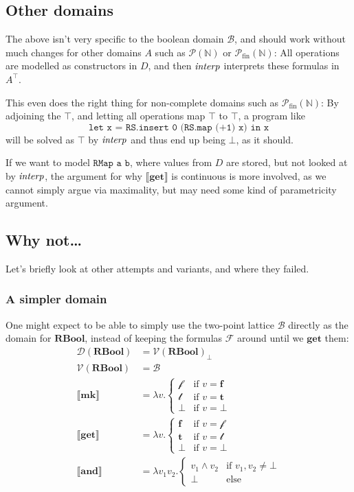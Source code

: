 \documentclass[manuscript,screen,acmsmall,nonacm]{acmart}
\newcommand{\syntax}[1]{\mathbf{#1}}
\newcommand{\tRBool}{\syntax{RBool}}
\newcommand{\sMk}{\syntax{mk}}
\newcommand{\sGet}{\syntax{get}}
\newcommand{\sAnd}{\syntax{and}}
\newcommand{\dFalse}{\mathbf{f}}
\newcommand{\dTrue}{\mathbf{t}}
\newcommand{\rBool}{\mathscr B}
\newcommand{\rTrue}{\mathscr{t}}
\newcommand{\rFalse}{\mathscr{f}}
\newcommand{\dRBool}{\mathcal F}
\newcommand{\D}[1]{\llbracket #1 \rrbracket}
\newcommand{\tV}[1]{\mathcal V(#1)}
\newcommand{\tD}[1]{\mathcal D(#1)}
\begin{document}
\subsection{Other domains}

The above isn’t very specific to the boolean domain $\rBool$, and should work without much changes for other domains $A$ such as $\mathcal P(\mathbb N)$ or $\mathcal P_{\text{fin}}(\mathbb N)$: All operations are modelled as constructors in $D$, and then $\operatorname{\textit{interp}}$ interprets these formulas in $A^\top$.

This even does the right thing for non-complete domains such as $\mathcal P_{\text{fin}}(\mathbb N)$: By adjoining the $\top$, and letting all operations map $\top$ to $\top$, a program like
\[
\texttt{let x = RS.insert 0 (RS.map (+1) x) in x}
\]
will be solved as $\top$ by $\operatorname{\textit{interp}}$ and thus end up being $\bot$, as it should.

If we want to model $\texttt{RMap a b}$, where values from $D$ are stored, but not looked at by $\operatorname{\textit{interp}}$, the argument for why $\D{\sGet}$ is continuous is more involved, as we cannot simply argue via maximality, but may need some kind of parametricity argument.

\subsection{Why not\ldots}\label{sec:why-not}

Let's briefly look at other attempts and variants, and where they failed.

\subsubsection{A simpler domain}

One might expect to be able to simply use the two-point lattice $\rBool$ directly as the domain for $\tRBool$, instead of keeping the formulas $\dRBool$ around until we $\sGet$ them:
\begin{align*}
\tD\tRBool &= {\tV\tRBool}_\bot\\
\tV\tRBool &= \rBool\\
\D{\sMk} &= \lambda v. \begin{cases}
\rFalse & \text{if } v = \dFalse \\
\rTrue & \text{if } v = \dTrue \\
\bot  & \text{if } v = \bot
\end{cases}\\
\D{\sGet} &= \lambda v. \begin{cases}
\dFalse & \text{if } v = \rFalse \\
\dTrue & \text{if } v = \rTrue \\
\bot  & \text{if } v = \bot
\end{cases}\\
\D{\sAnd} &= \lambda v_1 v_2. \begin{cases}
v_1 \wedge v_2 & \text{if } v_1, v_2 \ne \bot \\
\bot & \text{else}
\end{cases}\\
\end{align*}
\end{document}
